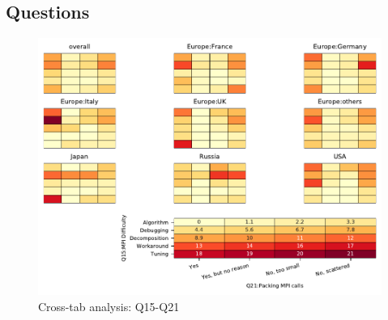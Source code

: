 
\subsection{Questions}


\begin{figure}
\begin{center}
\includegraphics[width=12cm]{../pdfs/Q15-Q21.pdf}
\caption{Cross-tab analysis: Q15-Q21}
\label{fig:Q15-Q21}
\end{center}
\end{figure}
